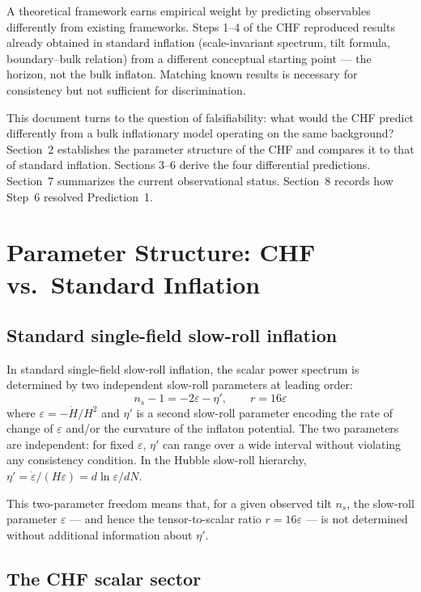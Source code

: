 \documentclass[12pt,a4paper]{article}
\begin{document}
A theoretical framework earns empirical weight by predicting observables differently from existing frameworks. Steps 1--4 of the CHF reproduced results already obtained in standard inflation (scale-invariant spectrum, tilt formula, boundary--bulk relation) from a different conceptual starting point --- the horizon, not the bulk inflaton. Matching known results is necessary for consistency but not sufficient for discrimination.

This document turns to the question of falsifiability: what would the CHF predict differently from a bulk inflationary model operating on the same background? Section~2 establishes the parameter structure of the CHF and compares it to that of standard inflation. Sections 3--6 derive the four differential predictions. Section~7 summarizes the current observational status. Section~8 records how Step~6 resolved Prediction~1.

\section{Parameter Structure: CHF vs.\ Standard Inflation}

\subsection{Standard single-field slow-roll inflation}

In standard single-field slow-roll inflation, the scalar power spectrum is determined by two independent slow-roll parameters at leading order:
\begin{equation}
n_s - 1 = -2\varepsilon - \eta', \qquad r = 16\varepsilon \tag{1}
\end{equation}
where $\varepsilon = -\dot{H}/H^2$ and $\eta'$ is a second slow-roll parameter encoding the rate of change of $\varepsilon$ and/or the curvature of the inflaton potential. The two parameters are independent: for fixed $\varepsilon$, $\eta'$ can range over a wide interval without violating any consistency condition. In the Hubble slow-roll hierarchy, $\eta' = \dot{\varepsilon}/(H\varepsilon) = d\ln\varepsilon/dN$.

This two-parameter freedom means that, for a given observed tilt $n_s$, the slow-roll parameter $\varepsilon$ --- and hence the tensor-to-scalar ratio $r = 16\varepsilon$ --- is not determined without additional information about $\eta'$.

\subsection{The CHF scalar sector}
\end{document}
